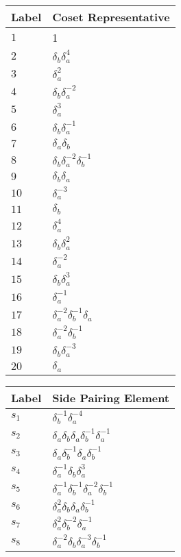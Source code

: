 \documentclass{article}
\begin{document}
\begin{center}
\begin{tabular}{ll}
\toprule
Label & Coset Representative\\
\midrule
$1$ & 1 \\
$2$ & $\delta_b^{}\delta_a^{4}$ \\
$3$ & $\delta_a^{2}$ \\
$4$ & $\delta_b^{}\delta_a^{-2}$ \\
$5$ & $\delta_a^{3}$ \\
$6$ & $\delta_b^{}\delta_a^{-1}$ \\
$7$ & $\delta_a^{}\delta_b^{}$ \\
$8$ & $\delta_b^{}\delta_a^{-2}\delta_b^{-1}$ \\
$9$ & $\delta_b^{}\delta_a^{}$ \\
$10$ & $\delta_a^{-3}$ \\
$11$ & $\delta_b^{}$ \\
$12$ & $\delta_a^{4}$ \\
$13$ & $\delta_b^{}\delta_a^{2}$ \\
$14$ & $\delta_a^{-2}$ \\
$15$ & $\delta_b^{}\delta_a^{3}$ \\
$16$ & $\delta_a^{-1}$ \\
$17$ & $\delta_a^{-2}\delta_b^{-1}\delta_a^{}$ \\
$18$ & $\delta_a^{-2}\delta_b^{-1}$ \\
$19$ & $\delta_b^{}\delta_a^{-3}$ \\
$20$ & $\delta_a^{}$ \\
\bottomrule
\end{tabular}
\hfill
\begin{tabular}{ll}
\toprule
Label & Side Pairing Element\\
\midrule
$s_{1}$ & $\delta_b^{-1}\delta_a^{-4}$ \\
$s_{2}$ & $\delta_a^{}\delta_b^{}\delta_a^{}\delta_b^{-1}\delta_a^{-1}$ \\
$s_{3}$ & $\delta_a^{}\delta_b^{-1}\delta_a^{}\delta_b^{-1}$ \\
$s_{4}$ & $\delta_a^{-1}\delta_b^{}\delta_a^{3}$ \\
$s_{5}$ & $\delta_a^{-1}\delta_b^{-1}\delta_a^{-2}\delta_b^{-1}$ \\
$s_{6}$ & $\delta_a^{2}\delta_b^{}\delta_a^{}\delta_b^{-1}$ \\
$s_{7}$ & $\delta_a^{2}\delta_b^{-2}\delta_a^{-1}$ \\
$s_{8}$ & $\delta_a^{-2}\delta_b^{}\delta_a^{-3}\delta_b^{-1}$ \\

\end{tabular}
\end{center}
\end{document}
